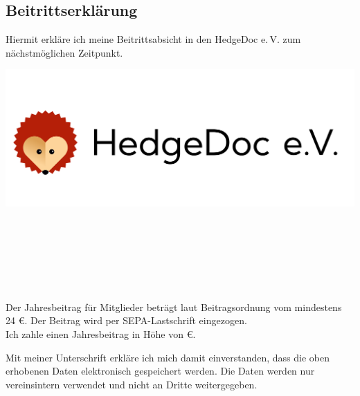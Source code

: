 \documentclass[paper=a4,twoside=false,DIV=15,fontsize=11pt,parskip=half]{scrartcl}
\begin{document}
\begin{Form}

\begin{minipage}[h]{0.5\textwidth}
  \section*{\huge Beitrittserklärung}
  Hiermit erkläre ich meine Beitrittsabsicht in den HedgeDoc e.\,V. zum nächstmöglichen Zeitpunkt.\\[-\baselineskip]
\end{minipage}
\begin{minipage}[h]{0.5\textwidth}
  \hfill
  \includegraphics[width=0.3\paperwidth]{./hedgedoc-ev.pdf}
\end{minipage}


\\[2mm]
\hfill {}\\[2mm]
\\[-\baselineskip]

\\[2mm]
\\[2mm]
\hfill {}\\[-\baselineskip]

Der Jahresbeitrag für Mitglieder beträgt laut Beitragsordnung vom \datumbeitrago mindestens 24 €. Der Beitrag wird per SEPA-Lastschrift eingezogen.\\[2mm]
Ich zahle einen Jahresbeitrag in Höhe von  €.

Mit meiner Unterschrift erkläre ich mich damit einverstanden, dass die oben erhobenen Daten elektronisch gespeichert werden.
Die Daten werden nur vereinsintern verwendet und nicht an Dritte weitergegeben.


\end{Form}
\end{document}
